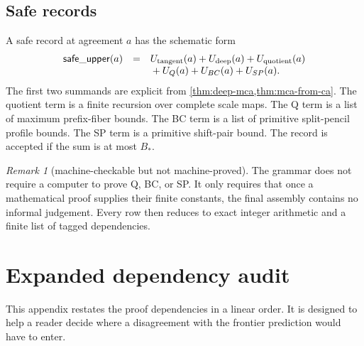 \documentclass[11pt]{article}
\theoremstyle{definition}
\theoremstyle{remark}
\newtheorem{remark}[theorem]{Remark}
\begin{document}
\subsection{Safe records}

A safe record at agreement \(a\) has the schematic form
\[
\begin{array}{rcl}
\mathsf{safe\_upper}(a)&=&
U_{\rm tangent}(a)+U_{\rm deep}(a)+U_{\rm quotient}(a)\\
&&{}+U_Q(a)+U_{BC}(a)+U_{SP}(a).
\end{array}
\]
The first two summands are explicit from \cref{thm:deep-mca,thm:mca-from-ca}.  The quotient term is a finite recursion over complete scale maps.  The Q term is a list of maximum prefix-fiber bounds.  The BC term is a list of primitive split-pencil profile bounds.  The SP term is a primitive shift-pair bound.  The record is accepted if the sum is at most \(B_*\).

\begin{remark}[machine-checkable but not machine-proved]
The grammar does not require a computer to prove Q, BC, or SP.  It only requires that once a mathematical proof supplies their finite constants, the final assembly contains no informal judgement.  Every row then reduces to exact integer arithmetic and a finite list of tagged dependencies.
\end{remark}

\section{Expanded dependency audit}\label{app:dependency-audit}

This appendix restates the proof dependencies in a linear order.  It is designed to help a reader decide where a disagreement with the frontier prediction would have to enter.
\end{document}
